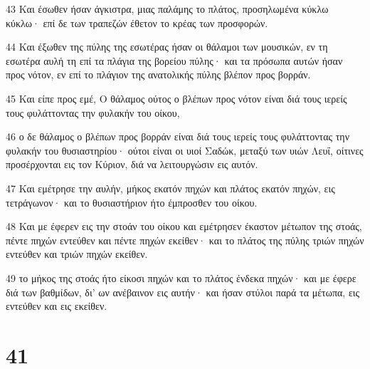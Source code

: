 \par 43 Και έσωθεν ήσαν άγκιστρα, μιας παλάμης το πλάτος, προσηλωμένα κύκλω κύκλω· επί δε των τραπεζών έθετον το κρέας των προσφορών.
\par 44 Και έξωθεν της πύλης της εσωτέρας ήσαν οι θάλαμοι των μουσικών, εν τη εσωτέρα αυλή τη επί τα πλάγια της βορείου πύλης· και τα πρόσωπα αυτών ήσαν προς νότον, εν επί το πλάγιον της ανατολικής πύλης βλέπον προς βορράν.
\par 45 Και είπε προς εμέ, Ο θάλαμος ούτος ο βλέπων προς νότον είναι διά τους ιερείς τους φυλάττοντας την φυλακήν του οίκου,
\par 46 ο δε θάλαμος ο βλέπων προς βορράν είναι διά τους ιερείς τους φυλάττοντας την φυλακήν του θυσιαστηρίου· ούτοι είναι οι υιοί Σαδώκ, μεταξύ των υιών Λευΐ, οίτινες προσέρχονται εις τον Κύριον, διά να λειτουργώσιν εις αυτόν.
\par 47 Και εμέτρησε την αυλήν, μήκος εκατόν πηχών και πλάτος εκατόν πηχών, εις τετράγωνον· και το θυσιαστήριον ήτο έμπροσθεν του οίκου.
\par 48 Και με έφερεν εις την στοάν του οίκου και εμέτρησεν έκαστον μέτωπον της στοάς, πέντε πηχών εντεύθεν και πέντε πηχών εκείθεν· και το πλάτος της πύλης τριών πηχών εντεύθεν και τριών πηχών εκείθεν.
\par 49 το μήκος της στοάς ήτο είκοσι πηχών και το πλάτος ένδεκα πηχών· και με έφερε διά των βαθμίδων, δι' ων ανέβαινον εις αυτήν· και ήσαν στύλοι παρά τα μέτωπα, εις εντεύθεν και εις εκείθεν.

\chapter{41}

